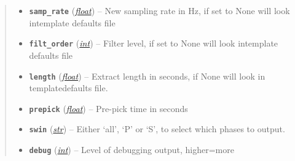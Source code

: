 \documentclass[a4paper,10pt,english]{sphinxmanual}
\begin{document}
\begin{fulllineitems}
\begin{quote}
\begin{description}
\begin{itemize}
\item {} 
\textbf{\texttt{samp\_rate}} (\href{https://docs.python.org/library/functions.html\#float}{\emph{float}}) -- New sampling rate in Hz, if set to None will look intemplate defaults file

\item {} 
\textbf{\texttt{filt\_order}} (\href{https://docs.python.org/library/functions.html\#int}{\emph{int}}) -- Filter level, if set to None will look intemplate defaults file

\item {} 
\textbf{\texttt{length}} (\href{https://docs.python.org/library/functions.html\#float}{\emph{float}}) -- Extract length in seconds, if None will look in templatedefaults file.

\item {} 
\textbf{\texttt{prepick}} (\href{https://docs.python.org/library/functions.html\#float}{\emph{float}}) -- Pre-pick time in seconds

\item {} 
\textbf{\texttt{swin}} (\href{https://docs.python.org/library/functions.html\#str}{\emph{str}}) -- Either `all', `P' or `S', to select which phases to output.

\item {} 
\textbf{\texttt{debug}} (\href{https://docs.python.org/library/functions.html\#int}{\emph{int}}) -- Level of debugging output, higher=more

\end{itemize}

\end{description}\end{quote}

\end{fulllineitems}

\end{document}
